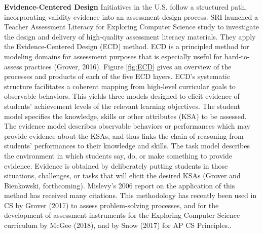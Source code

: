 

%



\textbf{Evidence-Centered Design}\newline
Initiatives in the U.S. follow a structured path, incorporating validity evidence into an assessment design process. SRI launched a Teacher Assessment Literacy for Exploring Computer Science study to investigate the design and delivery of high-quality assessment literacy materials. They apply the Evidence-Centered Design (ECD) method. ECD is a principled method for modeling domains for assessment purposes that is especially useful for hard-to-assess practices (Grover, 2016). Figure \ref{fig:ECD} gives an overview of the processes and products of each of the five ECD layers. ECD's systematic structure facilitates a coherent mapping from high-level curricular goals to observable behaviors. This yields three models designed to elicit evidence of students' achievement levels of the relevant learning objectives. The student model specifies the knowledge, skills or other attributes (KSA) to be assessed. The evidence model describes observable behaviors or performances which may provide evidence about the KSAs, and thus links the chain of reasoning from students’ performances to their knowledge and skills. The task model describes the environment in which students say, do, or make something to provide evidence. Evidence is obtained by deliberately putting students in those situations, challenges, or tasks that will elicit the desired KSAs (Grover and Bienkowski, forthcoming). Mislevy's 2006 report on the application of this method has received many citations. This methodology has recently been used in CS by Grover (2017) to assess problem-solving processes, and for the development of assessment instruments for the Exploring Computer Science curriculum by McGee (2018), and by Snow (2017) for AP CS Principles..






